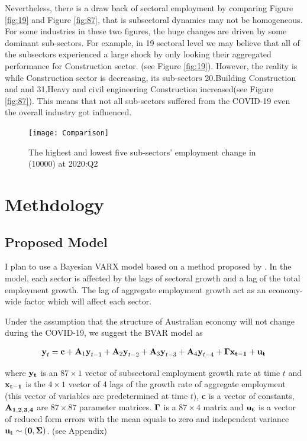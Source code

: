 \documentclass[11pt,a4paper,]{article}
\begin{document}
Nevertheless, there is a draw back of sectoral employment by comparing Figure \ref{fig:19} and Figure \ref{fig:87}, that is subsectoral dynamics may not be homogeneous. For some industries in these two figures, the huge changes are driven by some dominant sub-sectors. For example, in 19 sectoral level we may believe that all of the subsectors experienced a large shock by only looking their aggregated performance for Construction sector. (see Figure \ref{fig:19}). However, the reality is while Construction sector is decreasing, its sub-sectors 20.Building Construction and and 31.Heavy and civil engineering Construction increased(see Figure \ref{fig:87}). This means that not all sub-sectors suffered from the COVID-19 even the overall industry got influenced.

\begin{figure}[t]
\texttt{[image: Comparison]}
\centering
\caption{The highest and lowest five sub-sectors' employment change in (10000) at 2020:Q2}
\label{fig:comp}
\end{figure}

\hypertarget{methdology}{%
\section{Methdology}\label{methdology}}

\hypertarget{proposed-model}{%
\subsection{Proposed Model}\label{proposed-model}}

I plan to use a Bayesian VARX model based on a method proposed by \textcite{anderson2020}. In the model, each sector is affected by the lags of sectoral growth and a lag of the total employment growth. The lag of aggregate employment growth act as an economy-wide factor which will affect each sector.

Under the assumption that the structure of Australian economy will not change during the COVID-19, we suggest the BVAR model as

\[
\begin{aligned}
\textbf{y}_t=\textbf{c}+\textbf{A}_1 \textbf{y}_{t-1}+\textbf{A}_2\textbf{y}_{t-2}+\textbf{A}_3\textbf{y}_{t-3}+\textbf{A}_4\textbf{y}_{t-4}+\bf{\Gamma}\textbf{x}_{t-1}+\bf{u}_t
\end{aligned}
\]

where \(\bf{y}_t\) is an \(87\times1\) vector of subsectoral employment growth rate at time \(t\) and \(\bf{x}_{t-1}\) is the \(4\times1\) vector of 4 lags of the growth rate of aggregate employment (this vector of variables are predetermined at time \(t\)), \textbf{c} is a vector of constants, \(\bf{A}_{1,2,3,4}\) are \(87\times87\) parameter matrices. \(\bf{\Gamma}\) is a \(87\times4\) matrix and \(\bf{u}_t\) is a vector of reduced form errors with the mean equals to zero and independent variance \(\bf{u}_t \sim (0,\bf{\Sigma})\). (see Appendix)
\end{document}
